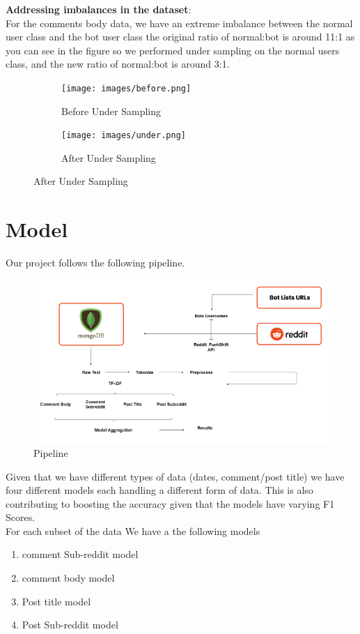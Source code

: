 \documentclass{article}
\begin{document}
\textbf{Addressing imbalances in the dataset}:\\

For the comments body data, we have an extreme imbalance between the normal user class and the bot user class the original ratio of normal:bot is around 11:1  as you can see in the figure so we performed under sampling on the normal users class, and the new ratio of normal:bot is around 3:1.

    \begin{figure}[H]

        \begin{subfigure}[t]{.5\textwidth}
            \centering
            \texttt{[image: images/before.png]}
                \caption{Before Under Sampling}
            \end{subfigure}
        \hfill
        \begin{subfigure}[t]{.5\textwidth}
            \centering
            \texttt{[image: images/under.png]}
                            \caption{After Under Sampling}
        \end{subfigure}
    \end{figure}



\section{Model}
Our project follows the following pipeline. \par
\begin{figure}[H]
    \centering
    \includegraphics[width=15cm ,keepaspectratio]{pipeline}

    \caption{Pipeline}
\end{figure} 
Given that we have different types of data (dates, comment/post title) we have four different models each handling a different form of data. This is also contributing to boosting the accuracy given that the models have varying F1 Scores.\\
For each subset of the data We have a the following models
\begin{enumerate}
    \item comment Sub-reddit model
    \item comment body model
    \item Post title model
    \item Post Sub-reddit model
\end{enumerate}
    
\end{document}

